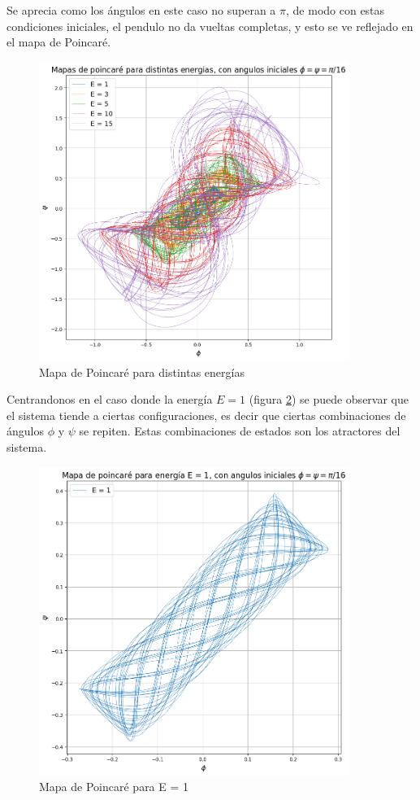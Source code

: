 \documentclass[11pt, twoside]{article} %
\begin{document}
Se aprecia como los ángulos en este caso no superan a $\pi$, de modo
con estas condiciones iniciales, el pendulo no da vueltas completas, 
y esto se ve reflejado en el mapa de Poincaré. 
\begin{figure}[h!]
    \centering
    \includegraphics[width=0.9\textwidth]{plots/poincare_energias.png}
    \caption{Mapa de Poincaré para distintas energías}
    \label{fig:poincare_energias}
\end{figure}

Centrandonos en el caso donde la energía $E = 1$ 
(figura \ref{fig:poincare_energia_1}) se puede observar que el sistema 
tiende a ciertas configuraciones, es decir que ciertas combinaciones de 
ángulos $\phi$ y $\psi$ se repiten. Estas combinaciones de estados son 
los atractores del sistema.

\begin{figure}[h!]
    \centering
    \includegraphics[width=0.9\textwidth]{plots/poincare_energias_1.png}
    \caption{Mapa de Poincaré para E = 1}
    \label{fig:poincare_energia_1}
\end{figure}
\end{document}
